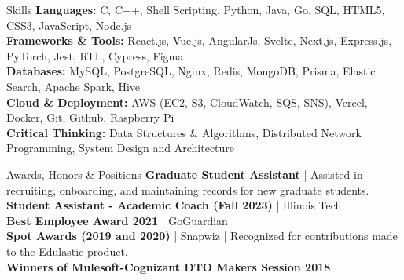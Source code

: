\documentclass{resume} %
\begin{document}
\vspace{-5pt}
\begin{rSection}{Skills}
   \small \textbf{Languages:} C, C++, Shell Scripting, Python, Java, Go, SQL, HTML5, CSS3, JavaScript, Node.js \\
   \small \textbf{Frameworks \& Tools:} React.js, Vue.js, AngularJs, Svelte, Next.js, Express.js, PyTorch, Jest, RTL, Cypress, Figma \\
   \small \textbf{Databases:} MySQL, PostgreSQL, Nginx, Redis, MongoDB, Prisma, Elastic Search, Apache Spark, Hive \\
   \small \textbf{Cloud \& Deployment:} AWS (EC2, S3, CloudWatch, SQS, SNS), Vercel, Docker, Git, Github, Raspberry Pi \\
   \small \textbf{Critical Thinking:} Data Structures \& Algorithms, Distributed Network Programming, System Design and Architecture
\end{rSection}

\vspace{-6pt}
\begin{rSection}{Awards, Honors \& Positions}
   \small \textbf{Graduate Student Assistant} | Assisted in recruiting, onboarding, and maintaining records for new graduate students. \\
   \small \textbf{Student Assistant - Academic Coach (Fall 2023)} | Illinois Tech \\
   \small \textbf{Best Employee Award 2021} | GoGuardian \\
   \small \textbf{Spot Awards (2019 and 2020)} | Snapwiz |  Recognized for contributions made to the Edulastic product. \\
   \small \textbf{Winners of Mulesoft-Cognizant DTO Makers Session 2018}
\end{rSection}

\end{document}
